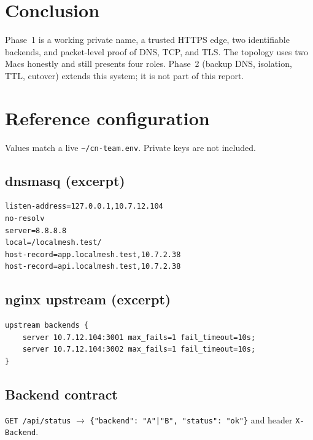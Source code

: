 \documentclass[11pt,a4paper]{article}
\begin{document}
\section{Conclusion}
Phase~1 is a working private name, a trusted HTTPS edge, two identifiable backends, and
packet-level proof of DNS, TCP, and TLS. The topology uses two Macs honestly and still
presents four roles. Phase~2 (backup DNS, isolation, TTL, cutover) extends this system;
it is not part of this report.

\appendix
\section{Reference configuration}
Values match a live \texttt{\textasciitilde/cn-team.env}. Private keys are not included.

\subsection{dnsmasq (excerpt)}
\begin{lstlisting}
listen-address=127.0.0.1,10.7.12.104
no-resolv
server=8.8.8.8
local=/localmesh.test/
host-record=app.localmesh.test,10.7.2.38
host-record=api.localmesh.test,10.7.2.38
\end{lstlisting}

\subsection{nginx upstream (excerpt)}
\begin{lstlisting}
upstream backends {
    server 10.7.12.104:3001 max_fails=1 fail_timeout=10s;
    server 10.7.12.104:3002 max_fails=1 fail_timeout=10s;
}
\end{lstlisting}

\subsection{Backend contract}
\texttt{GET /api/status} $\rightarrow$ \texttt{\{"backend": "A"|"B", "status": "ok"\}}
and header \texttt{X-Backend}.
\end{document}
